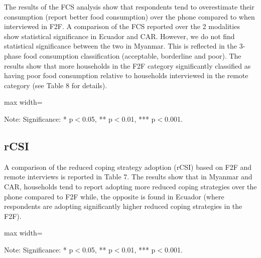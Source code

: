 \documentclass[11pt,harvard]{article}
\begin{document}
The results of the FCS analysis show that respondents tend to overestimate their consumption (report better food consumption) over the phone compared to when interviewed in F2F. A comparison of the FCS reported over the 2 modalities show statistical significance in Ecuador and CAR. However, we do not find statistical significance between the two in Myanmar. 
This is reflected in the 3-phase food consumption classification (acceptable, borderline and poor). The results show that more households in the F2F category significantly classified as having poor food consumption relative to households interviewed in the remote category (see Table 8 for details). 

	\begin{table}[htbp]
		\centering
		\begin{adjustbox}{max width=\textwidth}
			\begin{threeparttable}
				\caption{Impact of Survey Modality on Food Consumption Score and Groups}
				\scriptsize
				 
				\label{tab:FCS_Modality_All_Country}
				\begin{tablenotes}
					\item Note: Significance: * p$<$0.05, ** p$<$0.01, *** p$<$0.001. 
				\end{tablenotes}
			\end{threeparttable}
		\end{adjustbox}
	\end{table}
	
		\pagebreak
		
\subsection{rCSI}
A comparison of the reduced coping strategy adoption (rCSI) based on F2F and remote interviews is reported in Table 7. The results show that in Myanmar and CAR, households tend to report adopting more reduced coping strategies over the phone compared to F2F while, the opposite is found in Ecuador (where respondents are adopting significantly higher reduced coping strategies in the F2F).

\begin{table}[htbp]
	\centering
	\begin{adjustbox}{max width=\textwidth}
		\begin{threeparttable}
			\caption{Impact of Survey Modality on Reduced Coping Strategy Index Classification}
			\scriptsize
			 
			\label{tab:rCSI_Modality_All_Country}
			\begin{tablenotes}
				\item Note: Significance: * p$<$0.05, ** p$<$0.01, *** p$<$0.001. 
			\end{tablenotes}
		\end{threeparttable}
	\end{adjustbox}
\end{table}
\end{document}
